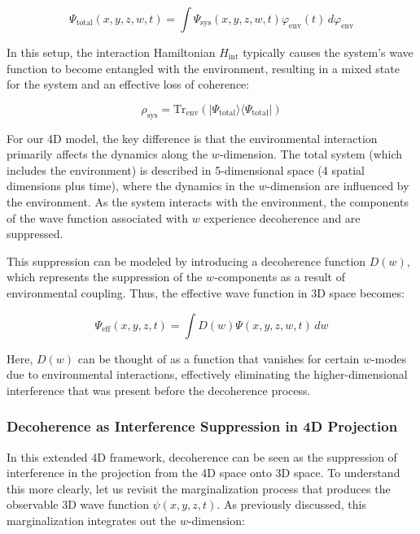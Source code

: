 \documentclass[12pt]{article}
\begin{document}
\begin{equation}
\Psi_{\text{total}}(x, y, z, w, t) = \int \Psi_{\text{sys}}(x, y, z, w, t) \varphi_{\text{env}}(t) \, d\varphi_{\text{env}}
\end{equation}

In this setup, the interaction Hamiltonian \( H_{\text{int}} \) typically causes the system's wave function to become entangled with the environment, resulting in a mixed state for the system and an effective loss of coherence:

\begin{equation}
\rho_{\text{sys}} = \text{Tr}_{\text{env}} \left( |\Psi_{\text{total}}\rangle \langle \Psi_{\text{total}}| \right)
\end{equation}

For our 4D model, the key difference is that the environmental interaction primarily affects the dynamics along the \( w \)-dimension. The total system (which includes the environment) is described in 5-dimensional space (4 spatial dimensions plus time), where the dynamics in the \( w \)-dimension are influenced by the environment. As the system interacts with the environment, the components of the wave function associated with \( w \) experience decoherence and are suppressed.

This suppression can be modeled by introducing a decoherence function \( D(w) \), which represents the suppression of the \( w \)-components as a result of environmental coupling. Thus, the effective wave function in 3D space becomes:

\begin{equation}
\Psi_{\text{eff}}(x, y, z, t) = \int D(w) \Psi(x, y, z, w, t) \, dw
\end{equation}

Here, \( D(w) \) can be thought of as a function that vanishes for certain \( w \)-modes due to environmental interactions, effectively eliminating the higher-dimensional interference that was present before the decoherence process.

\subsubsection{Decoherence as Interference Suppression in 4D Projection}

In this extended 4D framework, decoherence can be seen as the suppression of interference in the projection from the 4D space onto 3D space. To understand this more clearly, let us revisit the marginalization process that produces the observable 3D wave function \( \psi(x, y, z, t) \). As previously discussed, this marginalization integrates out the \( w \)-dimension:
\end{document}
